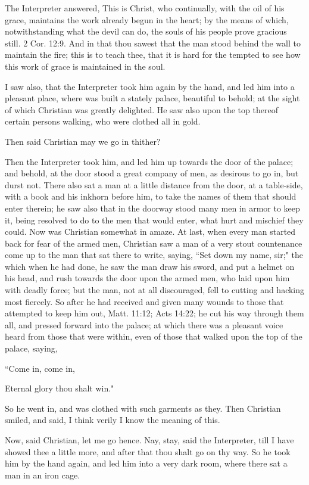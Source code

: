 The Interpreter answered, This is Christ, who continually, with the oil of his grace, maintains the work already begun in the heart; by the means of which, notwithstanding what the devil can do, the souls of his people prove gracious still. 2 Cor. 12:9. And in that thou sawest that the man stood behind the wall to maintain the fire; this is to teach thee, that it is hard for the tempted to see how this work of grace is maintained in the soul.

I saw also, that the Interpreter took him again by the hand, and led him into a pleasant place, where was built a stately palace, beautiful to behold; at the sight of which Christian was greatly delighted. He saw also upon the top thereof certain persons walking, who were clothed all in gold.

Then said Christian may we go in thither?

Then the Interpreter took him, and led him up towards the door of the palace; and behold, at the door stood a great company of men, as desirous to go in, but durst not. There also sat a man at a little distance from the door, at a table-side, with a book and his inkhorn before him, to take the names of them that should enter therein; he saw also that in the doorway stood many men in armor to keep it, being resolved to do to the men that would enter, what hurt and mischief they could. Now was Christian somewhat in amaze. At last, when every man started back for fear of the armed men, Christian saw a man of a very stout countenance come up to the man that sat there to write, saying, ``Set down my name, sir;" the which when he had done, he saw the man draw his sword, and put a helmet on his head, and rush towards the door upon the armed men, who laid upon him with deadly force; but the man, not at all discouraged, fell to cutting and hacking most fiercely. So after he had received and given many wounds to those that attempted to keep him out, Matt. 11:12; Acts 14:22; he cut his way through them all, and pressed forward into the palace; at which there was a pleasant voice heard from those that were within, even of those that walked upon the top of the palace, saying,

 ``Come in, come in,

Eternal glory thou shalt win."

So he went in, and was clothed with such garments as they. Then Christian smiled, and said, I think verily I know the meaning of this.

Now, said Christian, let me go hence. Nay, stay, said the Interpreter, till I have showed thee a little more, and after that thou shalt go on thy way. So he took him by the hand again, and led him into a very dark room, where there sat a man in an iron cage.

